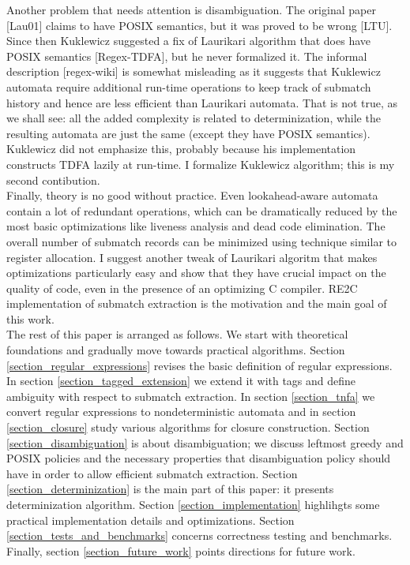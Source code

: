 \documentclass{article}
\theoremstyle{definition}
\begin{document}
\begin{multicols}{2}
Another problem that needs attention is disambiguation.
The original paper [Lau01] claims to have POSIX semantics, but it was proved to be wrong [LTU].
Since then Kuklewicz suggested a fix of Laurikari algorithm that does have POSIX semantics [Regex-TDFA], but he never formalized it.
The informal description [regex-wiki] is somewhat misleading as it suggests that Kuklewicz automata
require additional run-time operations to keep track of submatch history and hence are less efficient than Laurikari automata.
That is not true, as we shall see: all the added complexity is related to determinization,
while the resulting automata are just the same (except they have POSIX semantics).
Kuklewicz did not emphasize this, probably because his implementation constructs TDFA lazily at run-time.
I formalize Kuklewicz algorithm; this is my second contibution.
\\

Finally, theory is no good without practice.
Even lookahead-aware automata contain a lot of redundant operations,
which can be dramatically reduced by the most basic optimizations like liveness analysis and dead code elimination.
The overall number of submatch records can be minimized using technique similar to register allocation.
I suggest another tweak of Laurikari algoritm that makes optimizations particularly easy
and show that they have crucial impact on the quality of code, even in the presence of an optimizing C compiler.
RE2C implementation of submatch extraction is the motivation and the main goal of this work.
\\

The rest of this paper is arranged as follows.
We start with theoretical foundations and gradually move towards practical algorithms.
Section \ref{section_regular_expressions} revises the basic definition of regular expressions.
In section \ref{section_tagged_extension} we extend it with tags
and define ambiguity with respect to submatch extraction.
In section \ref{section_tnfa} we convert regular expressions to nondeterministic automata
and in section \ref{section_closure} study various algorithms for closure construction.
Section \ref{section_disambiguation} is about disambiguation;
we discuss leftmost greedy and POSIX policies and the necessary properties that disambiguation policy should have in order to allow efficient submatch extraction.
Section \ref{section_determinization} is the main part of this paper: it presents determinization algorithm.
Section \ref{section_implementation} highlihgts some practical implementation details and optimizations.
Section \ref{section_tests_and_benchmarks} concerns correctness testing and benchmarks.
Finally, section \ref{section_future_work} points directions for future work.


\end{multicols}
\end{document}
